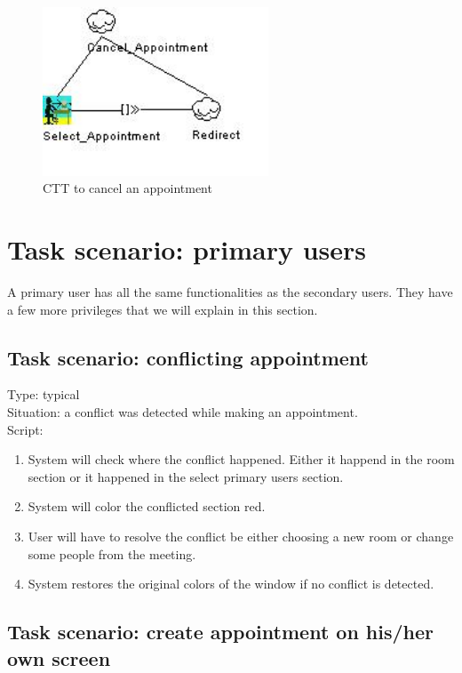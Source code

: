 \documentclass[11pt, a4paper,svglistings]{report}
\begin{document}
\begin{figure}[H]
\centering
    \includegraphics[width=0.6\textwidth]{CancelAppointment.jpg}
  \caption[Cancel appointment CTT]{\label{fig:CancelAppointment}CTT to cancel an appointment}
\end{figure}


\section{Task scenario: primary users}
A primary user has all the same functionalities as the secondary users. They have a few more privileges that we will explain in this section.


\subsection{Task scenario: conflicting appointment}


\label{subsec:conflictPrimary}Type: typical \\
Situation: a conflict was detected while making an appointment. \\
Script:
\begin{enumerate}
\item System will check where the conflict happened. Either it happend in the room section or it happened in the select primary users section.
\item System will color the conflicted section red.
\item User will have to resolve the conflict be either choosing a new room or change some people from the meeting.
\item System restores the original colors of the window if no conflict is detected.
\end{enumerate}


\subsection{Task scenario: create appointment on his/her own screen}
\end{document}
